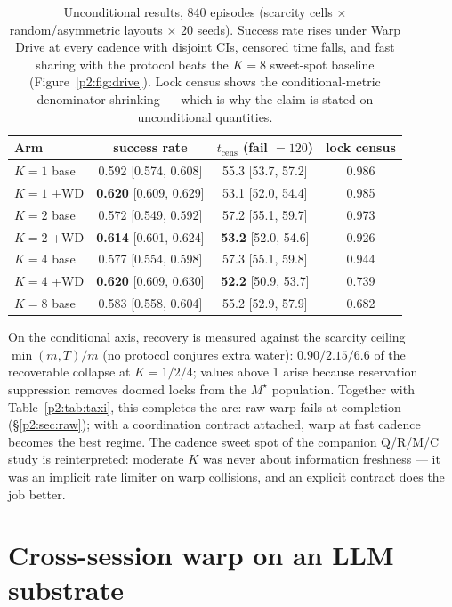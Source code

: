 \documentclass{article}
\newcommand{\mstar}{M^{\star}}
\begin{document}
\begin{table}[h]
\centering
\caption{Unconditional results, 840 episodes (scarcity cells
$\times$ random/asymmetric layouts $\times$ 20 seeds). Success rate
rises under Warp Drive at every cadence with disjoint CIs, censored
time falls, and fast sharing with the protocol beats the $K{=}8$
sweet-spot baseline (Figure~\ref{p2:fig:drive}). Lock census shows the
conditional-metric denominator shrinking --- which is why the claim is
stated on unconditional quantities.}
\label{p2:tab:wd}
\small
\begin{tabular}{lccc}
\toprule
Arm & success rate & $t_{\text{cens}}$ (fail $=120$) & lock census \\
\midrule
$K{=}1$ base & 0.592 [0.574, 0.608] & 55.3 [53.7, 57.2] & 0.986 \\
$K{=}1$ +WD  & \textbf{0.620} [0.609, 0.629] & 53.1 [52.0, 54.4] & 0.985 \\
$K{=}2$ base & 0.572 [0.549, 0.592] & 57.2 [55.1, 59.7] & 0.973 \\
$K{=}2$ +WD  & \textbf{0.614} [0.601, 0.624] & \textbf{53.2} [52.0, 54.6] & 0.926 \\
$K{=}4$ base & 0.577 [0.554, 0.598] & 57.3 [55.1, 59.8] & 0.944 \\
$K{=}4$ +WD  & \textbf{0.620} [0.609, 0.630] & \textbf{52.2} [50.9, 53.7] & 0.739 \\
$K{=}8$ base & 0.583 [0.558, 0.604] & 55.2 [52.9, 57.9] & 0.682 \\
\bottomrule
\end{tabular}
\end{table}

On the conditional axis, recovery is measured against the scarcity
ceiling $\min(m,T)/m$ (no protocol conjures extra water): $0.90 / 2.15
/ 6.6$ of the recoverable collapse at $K{=}1/2/4$; values above 1
arise because reservation suppression removes doomed locks from the
$\mstar$ population. Together with Table~\ref{p2:tab:taxi}, this completes
the arc: raw warp fails at completion (\S\ref{p2:sec:raw}); with a
coordination contract attached, warp at fast cadence becomes the best
regime. The cadence sweet spot of the companion Q/R/M/C study \citep{songlines1} is
reinterpreted: moderate $K$ was never about information freshness ---
it was an implicit rate limiter on warp collisions, and an explicit
contract does the job better.


\section{Cross-session warp on an LLM substrate}
\label{p2:sec:llm}
\end{document}
